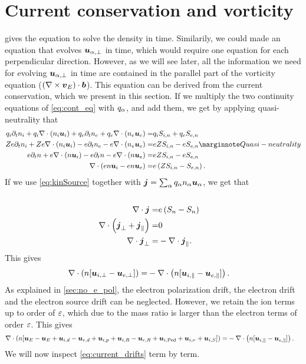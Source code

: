 \section{Current conservation and vorticity}
%
 gives the equation to solve the density in time.
Similarily, we could made an equation that evolves $\boldsymbol{u}_{\alpha,\perp}$ in time, which would require one equation for each perpendicular direction.
However, as we will see later, all the information we need for evolving $\boldsymbol{u}_{\alpha,\perp}$ in time are contained in the parallel part of the vorticity equation ($(\nabla\times \boldsymbol{v}_E)\cdot \boldsymbol{b}$).
This equation can be derived from the current conservation, which we present in this section.
If we multiply the two continuity equations of \cref{eq:cont_eq} with $q_\alpha$, and add them, we get by applying quasi-neutrality that
%
\begin{align*}
    q_i\partial_t n_i + q_i\div (n_i \ve{u}_i)
    + q_e\partial_t n_e + q_e\div (n_e \ve{u}_e)
    =&
    q_iS_{i,n} + q_eS_{e,n}
    \\
    Ze\partial_t n_i + Ze\div (n_i \ve{u}_i)
    - e\partial_t n_e - e\div (n_e \ve{u}_e)
    =&
    eZS_{i,n} - eS_{e,n}
    \note{Quasi-neutrality}
    \\
    e\partial_t n + e\div (n \ve{u}_i)
    - e\partial_t n - e\div (n \ve{u}_e)
    =&
    eZS_{i,n} - eS_{e,n}
    \\
    \div (en \ve{u}_i - en \ve{u}_e) =&
    e\L(ZS_{i,n} - S_{e,n}\R).
\end{align*}
%
If we use \cref{eq:kinSource} together with $\boldsymbol{j} = \sum_{\alpha}q_\alpha n_\alpha\boldsymbol{u}_\alpha$, we get that
%
\begin{align*}
    \\
    \nabla\cdot \boldsymbol{j} =&
    e\left(S_{n} - S_{n}\right)
    \\
    \nabla\cdot \left( \boldsymbol{j}_\perp + \boldsymbol{j}_\|\right)=& 0
    \\
    \nabla\cdot \boldsymbol{j}_\perp =& -\nabla\cdot \boldsymbol{j}_\|.
\end{align*}
%
This gives
%
\begin{align*}
    \nabla\cdot \left( n [\boldsymbol{u}_{i,\perp} - \boldsymbol{u}_{e,\perp}] \right) =&
    -\nabla\cdot \left(n [\boldsymbol{u}_{i,\|} - \boldsymbol{u}_{e,\|}]\right).
\end{align*}
%
As explained in \cref{sec:no_e_pol}, the electron polarization drift, the electron drift and the electron source drift can be neglected.
However, we retain the ion terms up to order of $\varepsilon$, which due to the mass ratio is larger than the electron terms of order $\varepsilon$.
This gives
%
\begin{align}
    \nabla\cdot \left( n [
   \boldsymbol{u}_{E} - \boldsymbol{u}_{E}
  +\boldsymbol{u}_{i,d} - \boldsymbol{u}_{e,d}
  +\boldsymbol{u}_{i,p}
  +\boldsymbol{u}_{i,R} - \boldsymbol{u}_{e,R}
  +\boldsymbol{u}_{i,\text{Ped}}
  +\boldsymbol{u}_{i,\nu}
  +\boldsymbol{u}_{i,S}
  ] \right) =&
  -\nabla\cdot \left(n [\boldsymbol{u}_{i,\|} - \boldsymbol{u}_{e,\|}]\right).
  \label{eq:current_drifts}
\end{align}
%
We will now inspect \cref{eq:current_drifts} term by term.

